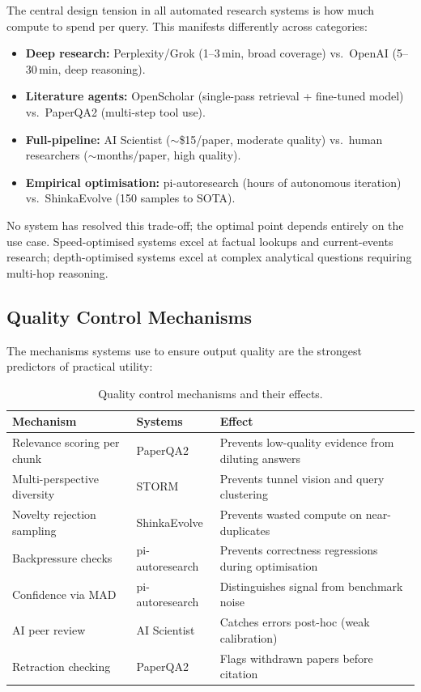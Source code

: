 \documentclass[11pt,a4paper]{article}
\begin{document}
The central design tension in all automated research systems is how much
compute to spend per query. This manifests differently across categories:

\begin{itemize}[nosep]
  \item \textbf{Deep research:} Perplexity/Grok (1--3\,min, broad
    coverage) vs.\ OpenAI (5--30\,min, deep reasoning).
  \item \textbf{Literature agents:} OpenScholar (single-pass retrieval +
    fine-tuned model) vs.\ PaperQA2 (multi-step tool use).
  \item \textbf{Full-pipeline:} AI Scientist ($\sim$\$15/paper, moderate
    quality) vs.\ human researchers ($\sim$months/paper, high quality).
  \item \textbf{Empirical optimisation:} pi-autoresearch (hours of
    autonomous iteration) vs.\ ShinkaEvolve (150 samples to SOTA).
\end{itemize}

\noindent
No system has resolved this trade-off; the optimal point depends
entirely on the use case. Speed-optimised systems excel at factual
lookups and current-events research; depth-optimised systems excel at
complex analytical questions requiring multi-hop reasoning.

\subsection{Quality Control Mechanisms}

The mechanisms systems use to ensure output quality are the strongest
predictors of practical utility:

\begin{table}[h]
\centering
\small
\begin{tabular}{@{}L{3.8cm}L{3.5cm}L{5.5cm}@{}}
\toprule
\textbf{Mechanism} & \textbf{Systems} & \textbf{Effect} \\
\midrule
Relevance scoring per chunk & PaperQA2 &
  Prevents low-quality evidence from diluting answers \\[0.3em]
Multi-perspective diversity & STORM &
  Prevents tunnel vision and query clustering \\[0.3em]
Novelty rejection sampling & ShinkaEvolve &
  Prevents wasted compute on near-duplicates \\[0.3em]
Backpressure checks & pi-autoresearch &
  Prevents correctness regressions during optimisation \\[0.3em]
Confidence via MAD & pi-autoresearch &
  Distinguishes signal from benchmark noise \\[0.3em]
AI peer review & AI Scientist &
  Catches errors post-hoc (weak calibration) \\[0.3em]
Retraction checking & PaperQA2 &
  Flags withdrawn papers before citation \\
\bottomrule
\end{tabular}
\caption{Quality control mechanisms and their effects.}
\label{tab:quality}
\end{table}
\end{document}
